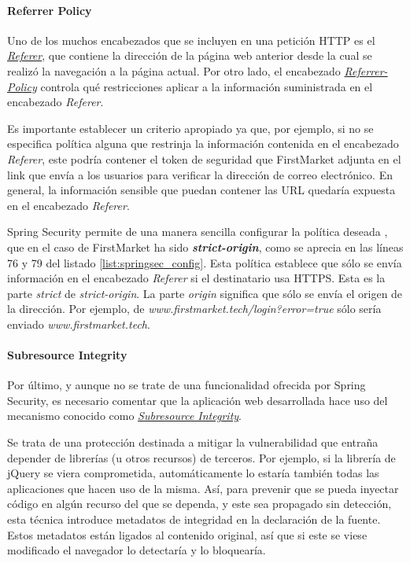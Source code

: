 \documentclass[a4paper,12pt,twoside,openright]{report}
\begin{document}
	\paragraph{Referrer  Policy}
	Uno de los muchos encabezados que se incluyen en una petición HTTP es el \href{https://developer.mozilla.org/en-US/docs/Web/HTTP/Headers/Referer}{\emph{Referer}}, que contiene la dirección de la página web anterior desde la cual se realizó la navegación a la página actual. Por otro lado, el encabezado \href{https://developer.mozilla.org/en-US/docs/Web/HTTP/Headers/Referrer-Policy}{\emph{Referrer-Policy}} controla qué restricciones aplicar a la información suministrada en el encabezado \emph{Referer}.
	
	Es importante establecer un criterio apropiado ya que, por ejemplo, si no se especifica política alguna que restrinja la información contenida en el encabezado \emph{Referer}, este podría contener el token de seguridad que FirstMarket adjunta en el link que envía a los usuarios para verificar la dirección de correo electrónico. En general, la información sensible que puedan contener las URL quedaría expuesta en el encabezado \emph{Referer}.
	
	Spring Security permite de una manera sencilla configurar la política deseada \cite{Alex2020}, que en el caso de FirstMarket ha sido \textbf{\emph{strict-origin}}, como se aprecia en las líneas 76 y 79 del listado \ref{list:springsec_config}. Esta política establece que sólo se envía información en el encabezado \emph{Referer} si el destinatario usa HTTPS. Esta es la parte \emph{strict} de \emph{strict-origin}. La parte \emph{origin} significa que sólo se envía el origen de la dirección. Por ejemplo, de \emph{www.firstmarket.tech/login?error=true} sólo sería enviado \emph{www.firstmarket.tech}.
	
	\paragraph{Subresource Integrity}
	Por último, y aunque no se trate de una funcionalidad ofrecida por Spring Security, es necesario comentar que la aplicación web desarrollada hace uso del mecanismo conocido como \href{https://www.w3.org/TR/SRI/}{\emph{Subresource Integrity}}. 
	
	Se trata de una protección destinada a mitigar la vulnerabilidad que entraña depender de librerías (u otros recursos) de terceros. Por ejemplo, si la librería de jQuery se viera comprometida, automáticamente lo estaría también todas las aplicaciones que hacen uso de la misma. Así, para prevenir que se pueda inyectar código en algún recurso del que se dependa, y este sea propagado sin detección, esta técnica introduce metadatos de integridad en la declaración de la fuente. Estos metadatos están ligados al contenido original, así que si este se viese modificado el navegador lo detectaría y lo bloquearía.
	
\end{document}
